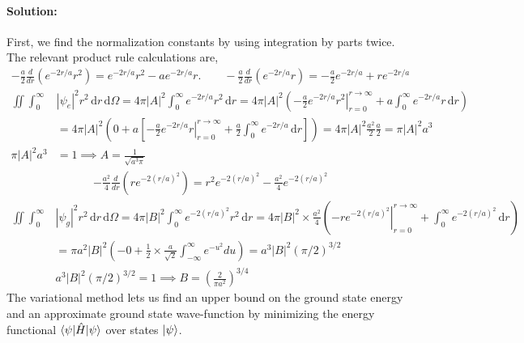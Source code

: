 \documentclass[10pt]{article}
\newcommand{\1}{\mathbf 1}
\begin{document}
\paragraph{Solution:}
First, we find the normalization constants by using integration by parts twice.
The relevant product rule calculations are,
\begin{align}
	-\frac{a}{2}\frac{d}{dr} (e^{-2r/a}r^2)
	=
	e^{-2r/a}r^2
	-
	ae^{-2r/a}r.
	\qquad
	-\frac{a}{2}\frac{d}{dr}(e^{-2r/a}r)
	=
	-\frac{a}{2}e^{-2r/a}
	+
	 r e^{-2r/a}
\end{align}
\begin{align}
	\iint
	\int_0^\infty 
	&\nonumber|\psi_e|^2 r^2  \, \mathrm{d}r\, \mathrm{d}\Omega
	=
	4\pi |A|^2\int_0^\infty e^{-2r/a} r^2  \, \mathrm{d}r
	=
	4\pi |A|^2
	\left(
	\left.-\frac{a}{2} e^{-2r/a}r^2\right|_{r=0}^{r \to \infty}
	+
	a \int_{0}^\infty e^{-2r/a} r
	\,
	\mathrm{d}r
	\right)
	\\
	&=
	4\pi |A|^2
	\left(
	0
	+
	a 
	\left[
		\left.-\frac{a}{2}
		e^{-2r/a}r
		\right|_{r=0}^{r\to \infty}
	+\frac{a}{2}
	\int_0^\infty
	e^{-2r/a}
	\,\mathrm{d}r
	\right]
	\right)
	=
	4\pi |A|^2 
	\frac{a^2}{2}
	\frac{a}{2}
	=
	\pi |A|^2 a^3\\
	\pi |A|^2 a^3 &= 1 \implies A=\frac{1}{\sqrt{a^3 \pi}}
\end{align}
\begin{align}
	-\frac{a^2}{4}
	\frac{d}{dr}(r e^{-2(r/a)^2})
	=
	r^2 e^{-2(r/a)^2}
	-
	\frac{a^2}{4}
	e^{-2(r/a)^2}
\end{align}
\begin{align}
	\iint
	\int_0^{\infty}&\nonumber
	\left|\psi_g\right|^2r^2 \,\mathrm{d}r 	\,\mathrm{d}\Omega
	=
	4\pi |B|^2
	\int_0^\infty e^{-2(r/a)^2}r^2 \,\mathrm{d}r
	=
	4\pi |B|^2
	\times
	\frac{a^2}{4}
	\left(
	-\left.r e^{-2(r/a)^2}\right|_{r=0}^{r \to \infty}
	+
	\int_0^\infty e^{-2(r/a)^2} \,\mathrm{d}r
	\right)
	\\
	&=
	\pi a^2 |B|^2
	\left(
		-0
		+
		\frac{1}{2}
		\times
		\frac{a}{\sqrt{2}}
		\int_{-\infty}^\infty
		e^{-u^2}
		du
	\right)
	=
	a^3 |B|^2 (\pi/2)^{3/2}\\
	&
	a^3 |B|^2 (\pi/2)^{3/2} = 1
	\implies
	B = \left(
		\frac{2}{\pi a^2}
	\right)^{3/4}
\end{align}
The variational method lets us find an upper bound on the ground state energy and an approximate ground state wave-function by minimizing the energy functional $\braket{\psi | \hat H | \psi}$ over states $\ket{\psi}$.
\end{document}

